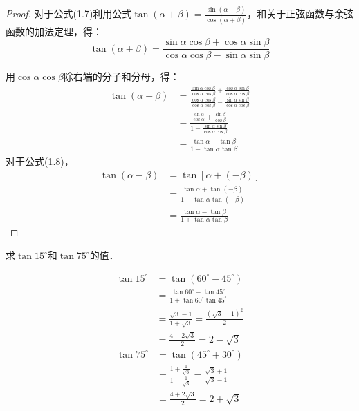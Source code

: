 \begin{proof}
    对于公式(1.7)利用公式$\tan(\alpha+\beta)=
\frac{\sin (\alpha+\beta)}{\cos (\alpha+\beta)}$，和关于正弦函数与余弦函数的加法定理，得：
\[\tan(\alpha+\beta)=\frac{\sin\alpha\cos\beta+\cos\alpha\sin\beta}{\cos\alpha\cos\beta-\sin\alpha\sin\beta} \]

用$\cos\alpha\cos\beta$除右端的分子和分母，得：
\[\begin{split}
    \tan(\alpha+\beta)&=\frac{\frac{\sin\alpha\cos\beta}{\cos\alpha\cos\beta}+\frac{\cos\alpha\sin\beta}{\cos\alpha\cos\beta}}{\frac{\cos\alpha\cos\beta}{\cos\alpha\cos\beta}-\frac{\sin\alpha\sin\beta}{\cos\alpha\cos\beta}}\\
&=\frac{\frac{\sin\alpha}{\cos\alpha}+\frac{\sin\beta}{\cos\beta}}{1-\frac{\sin\alpha\sin\beta}{\cos\alpha\cos\beta}}\\
&=\frac{\tan\alpha+\tan\beta}{1-\tan\alpha\tan\beta}
\end{split}\]
对于公式(1.8)，
\[\begin{split}
    \tan(\alpha-\beta)&=\tan[\alpha+(-\beta)]\\
    &=\frac{\tan\alpha+\tan(-\beta)}{1-\tan\alpha\tan(-\beta)}\\
    &=\frac{\tan\alpha-\tan\beta}{1+\tan\alpha\tan\beta}
\end{split} \]
\end{proof}

\begin{example}
    求$\tan15^{\circ}$和$\tan75^{\circ}$的值．
\end{example}

\begin{solution}
\[\begin{split}
    \tan15^{\circ}&=\tan (60^{\circ}-45^{\circ})\\
&=\frac{\tan 60^{\circ}-\tan 45^{\circ}}{1+\tan 60^{\circ}\tan45^{\circ}}\\
&=\frac{\sqrt{3}-1}{1+\sqrt{3}}=\frac{(\sqrt{3}-1)^2}{2}\\
&=\frac{4-2\sqrt{3}}{2}=2-\sqrt{3}
\end{split}\]
\[\begin{split}
    \tan 75^{\circ}&=\tan (45^{\circ}+30^{\circ})\\
&=\frac{1+\frac{1}{\sqrt{3}}}{1-\frac{1}{\sqrt{3}}}=\frac{\sqrt{3}+1}{\sqrt{3}-1}\\
&=\frac{4+2\sqrt{3}}{2}=2+\sqrt{3}
\end{split}\]
\end{solution}


